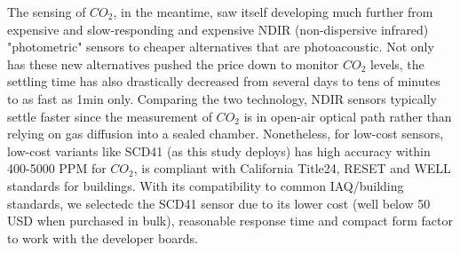 The sensing of $CO_2$, in the meantime, saw itself developing much further from expensive and slow-responding and expensive NDIR (non-dispersive infrared) "photometric" sensors to cheaper alternatives that are photoacoustic. Not only has these new alternatives pushed the price down to monitor $CO_2$ levels, the settling time has also drastically decreased from several days \cite{emmerich2005} to tens of minutes \cite{fisk2008} to as fast as 1min only\cite{sensirion2021,sensirion_scd4x_nodate}. Comparing the two technology, NDIR sensors typically settle faster since the measurement of $CO_2$ is in open-air optical path rather than relying on gas diffusion into a sealed chamber. Nonetheless, for low-cost sensors, low-cost variants like SCD41 (as this study deploys) has high accuracy within 400-5000 PPM for $CO_2$, is compliant with California Title24, RESET and WELL standards for buildings\cite{senseair2020,sensirion2021}. With its compatibility to common IAQ/building standards, we selectedc the SCD41 sensor due to its lower cost (well below 50 USD when purchased in bulk), reasonable response time and compact form factor to work with the developer boards.